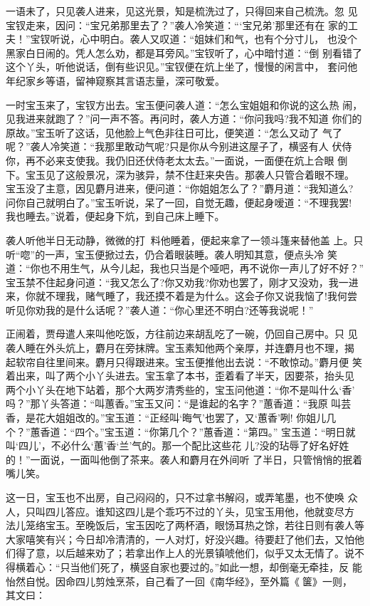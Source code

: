 一语未了，只见袭人进来，见这光景，知是梳洗过了，只得回来自己梳洗。忽
见宝钗走来，因问：“宝兄弟那里去了？”袭人冷笑道：“‘宝兄弟’那里还有在
家的工夫！”宝钗听说，心中明白。袭人又叹道：“姐妹们和气，也有个分寸儿，
也没个黑家白日闹的。凭人怎么劝，都是耳旁风。”宝钗听了，心中暗忖道：“倒
别看错了这个丫头，听他说话，倒有些识见。”宝钗便在炕上坐了，慢慢的闲言中，
套问他年纪家乡等语，留神窥察其言语志量，深可敬爱。

一时宝玉来了，宝钗方出去。宝玉便问袭人道：“怎么宝姐姐和你说的这么热
闹，见我进来就跑了？”问一声不答。再问时，袭人方道：“你问我吗?我不知道
你们的原故。”宝玉听了这话，见他脸上气色非往日可比，便笑道：“怎么又动了
气了呢？”袭人冷笑道：“我那里敢动气呢?只是你从今别进这屋子了，横竖有人
伏侍你，再不必来支使我。我仍旧还伏侍老太太去。”一面说，一面便在炕上合眼
倒下。宝玉见了这般景况，深为骇异，禁不住赶来央告。那袭人只管合着眼不理。
宝玉没了主意，因见麝月进来，便问道：“你姐姐怎么了？”麝月道：“我知道么?
问你自己就明白了。”宝玉听说，呆了一回，自觉无趣，便起身嗳道：“不理我罢!
我也睡去。”说着，便起身下炕，到自己床上睡下。

袭人听他半日无动静，微微的打，料他睡着，便起来拿了一领斗篷来替他盖
上。只听“唿”的一声，宝玉便掀过去，仍合着眼装睡。袭人明知其意，便点头冷
笑道：“你也不用生气，从今儿起，我也只当是个哑吧，再不说你一声儿了好不好？”
宝玉禁不住起身问道：“我又怎么了?你又劝我?你劝也罢了，刚才又没劝，我一进
来，你就不理我，赌气睡了，我还摸不着是为什么。这会子你又说我恼了!我何尝
听见你劝我的是什么话呢？”袭人道：“你心里还不明白?还等我说呢！”

正闹着，贾母遣人来叫他吃饭，方往前边来胡乱吃了一碗，仍回自己房中。只
见袭人睡在外头炕上，麝月在旁抹牌。宝玉素知他两个亲厚，并连麝月也不理，揭
起软帘自往里间来。麝月只得跟进来。宝玉便推他出去说：“不敢惊动。”麝月便
笑着出来，叫了两个小丫头进去。宝玉拿了本书，歪着看了半天，因要茶，抬头见
两个小丫头在地下站着，那个大两岁清秀些的，宝玉问他道：“你不是叫什么‘香’
吗？”那丫头答道：“叫蕙香。”宝玉又问：“是谁起的名字？”蕙香道：“我原
叫芸香，是花大姐姐改的。”宝玉道：“正经叫‘晦气’也罢了，又‘蕙香’咧!
你姐儿几个？”蕙香道：“四个。”宝玉道：“你第几个？”蕙香道：“第四。”
宝玉道：“明日就叫‘四儿’，不必什么‘蕙’香‘兰’气的。那一个配比这些花
儿?没的玷辱了好名好姓的！”一面说，一面叫他倒了茶来。袭人和麝月在外间听
了半日，只管悄悄的抿着嘴儿笑。

这一日，宝玉也不出房，自己闷闷的，只不过拿书解闷，或弄笔墨，也不使唤
众人，只叫四儿答应。谁知这四儿是个乖巧不过的丫头，见宝玉用他，他就变尽方
法儿笼络宝玉。至晚饭后，宝玉因吃了两杯酒，眼饧耳热之馀，若往日则有袭人等
大家嘻笑有兴；今日却冷清清的，一人对灯，好没兴趣。待要赶了他们去，又怕他
们得了意，以后越来劝了；若拿出作上人的光景镇唬他们，似乎又太无情了。说不
得横着心：“只当他们死了，横竖自家也要过的。”如此一想，却倒毫无牵挂，反
能怡然自悦。因命四儿剪烛烹茶，自己看了一回《南华经》，至外篇《箧》一则，
其文曰：

